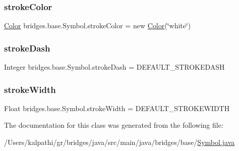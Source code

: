 \mbox{\label{classbridges_1_1base_1_1_symbol_a51a9a36983b00156284d86ca80cccfb0}} 
\subsubsection{\texorpdfstring{strokeColor}{strokeColor}}
{\footnotesize\ttfamily \mbox{\hyperlink{classbridges_1_1base_1_1_color}{Color}} bridges.\+base.\+Symbol.\+stroke\+Color = new \mbox{\hyperlink{classbridges_1_1base_1_1_color}{Color}}(\char`\"{}white\char`\"{})\hspace{0.3cm}{\ttfamily [protected]}}

\mbox{\label{classbridges_1_1base_1_1_symbol_a04134e835474c4747e334389f00513c0}} 
\subsubsection{\texorpdfstring{strokeDash}{strokeDash}}
{\footnotesize\ttfamily Integer bridges.\+base.\+Symbol.\+stroke\+Dash = D\+E\+F\+A\+U\+L\+T\+\_\+\+S\+T\+R\+O\+K\+E\+D\+A\+SH\hspace{0.3cm}{\ttfamily [protected]}}

\mbox{\label{classbridges_1_1base_1_1_symbol_a9f90a6efb9cb7a2f4e38c46862ae5a95}} 
\subsubsection{\texorpdfstring{strokeWidth}{strokeWidth}}
{\footnotesize\ttfamily Float bridges.\+base.\+Symbol.\+stroke\+Width = D\+E\+F\+A\+U\+L\+T\+\_\+\+S\+T\+R\+O\+K\+E\+W\+I\+D\+TH\hspace{0.3cm}{\ttfamily [protected]}}



The documentation for this class was generated from the following file\+:\begin{DoxyCompactItemize}
\item 
/\+Users/kalpathi/gr/bridges/java/src/main/java/bridges/base/\mbox{\hyperlink{_symbol_8java}{Symbol.\+java}}\end{DoxyCompactItemize}
